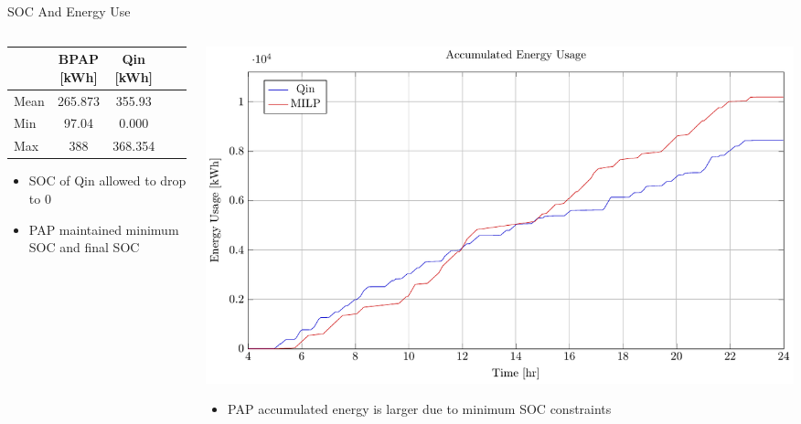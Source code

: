 \documentclass[aspectratio=169,dvipsnames]{beamer}
\begin{document}
\begin{frame}[label={sec:orgbc0e8dd}]{SOC And Energy Use}
\begin{columns}
\begin{column}{0.5\columnwidth}
\begin{center}
\begin{tabular}{l|cccc}
\hline
 & BPAP [kWh] & Qin [kWh]\\[0pt]
\hline
Mean & 265.873 & 355.93\\[0pt]
Min & 97.04 & 0.000\\[0pt]
Max & 388 & 368.354\\[0pt]
\hline
\end{tabular}
\end{center}

\begin{itemize}
\item SOC of Qin allowed to drop to 0
\item PAP maintained minimum SOC and final SOC
\end{itemize}
\end{column}

\begin{column}{0.5\columnwidth}
\begin{center}
\includegraphics[width=\textwidth]{./img/milp-pap/energy-milp-pap.pdf}
\end{center}

\begin{itemize}
\item PAP accumulated energy is larger due to minimum SOC constraints
\end{itemize}
\end{column}
\end{columns}
\end{frame}
\end{document}
